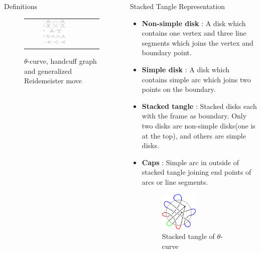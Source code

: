 \documentclass[final]{beamer}
\begin{document}
\begin{frame}[t]
\begin{columns}[t]
\begin{block}{Definitions}
\begin{figure}[h]
\begin{tabular}{ccc}
          \includegraphics[width=0.43\textwidth]{figure/reidemeister.png} \\
        \end{tabular}
        \caption{$\theta$-curve, handcuff graph and generalized Reidemeister move}
    \end{figure}

    
  \end{block}
  \begin{block}{Stacked Tangle Representation}

    \begin{itemize}
    \item \textbf{Non-simple disk} : A disk which contains one vertex and three line segments which joins the vertex and boundary point. 
    \item \textbf{Simple disk} : A disk which contains simple arc which joins two points on the boundary.
    \item \textbf{Stacked tangle} : Stacked disks each with the frame as boundary. Only two disks are non-simple disks(one is at the top), and others are simple disks. \\
    \item \textbf{Caps} : Simple arc in outside of stacked tangle joining end points of arcs or line segments. \\
    \begin{figure}
      \centering
      \includegraphics[width=0.45\textwidth]{figure/stacked_theta.png}
      \caption{Stacked tangle of $\theta$-curve}
    \end{figure}
    

\end{itemize}
\end{block}
\end{columns}
\end{frame}
\end{document}
